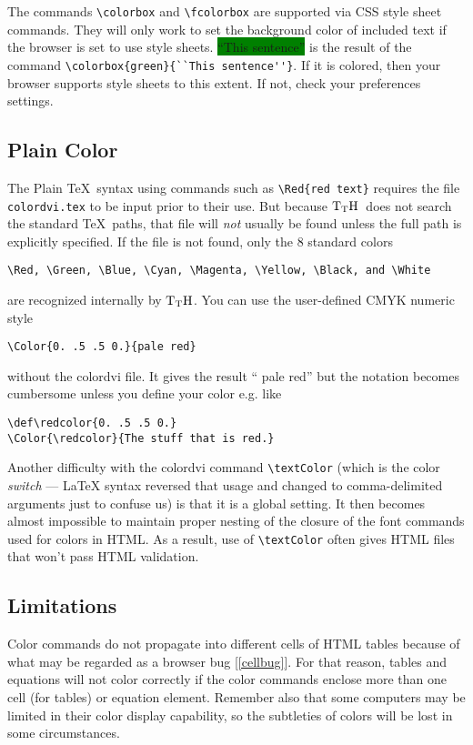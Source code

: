 \documentclass[12pt]{article}
\newif\iftth
\def\TtH{$\rm{}T_TH$}
\begin{document}
The commands \verb!\colorbox! and \verb!\fcolorbox! are supported via
CSS style sheet commands. They will only work to set the background
color of included text if the browser is set to use style sheets. 
\colorbox{green}{``This sentence''} is the result of the command
\verb!\colorbox{green}{``This sentence''}!. If it is colored, then
your browser supports style sheets to this extent. If not, check your
preferences settings.

\subsection{Plain Color}

The Plain \TeX\ syntax using commands such as \verb!\Red{red text}! requires
the file \verb!colordvi.tex! to be input prior to their use. But
because \TtH\ does not search the standard \TeX\ paths, that file will
\emph{not} usually be found unless the full path is explicitly
specified. If the file is not found, only the 8 standard colors
\begin{verbatim}
\Red, \Green, \Blue, \Cyan, \Magenta, \Yellow, \Black, and \White
\end{verbatim}
 are
recognized internally by \TtH. You can use the user-defined CMYK numeric
style 
\begin{verbatim}
\Color{0. .5 .5 0.}{pale red}
\end{verbatim}
without the colordvi
file. It gives the result ``\iftth\Color{0. .5 .5 0.}{pale red}\else
\textcolor[cmyk]{0.,.5,.5,0.}{pale red}\fi'' but the
notation becomes cumbersome unless you define your color
e.g. like
\begin{verbatim}
\def\redcolor{0. .5 .5 0.}
\Color{\redcolor}{The stuff that is red.}
\end{verbatim}

Another difficulty with the colordvi
command \verb!\textColor! (which is the color \emph{switch} --- \LaTeX
syntax reversed that usage and changed to comma-delimited arguments
just to confuse us) is that it is a global setting. It then
becomes almost impossible to maintain proper nesting of the closure of
the font commands used for colors in HTML. As a result, use of
\verb!\textColor! often gives HTML files that won't pass HTML validation.

\subsection{Limitations}
Color commands do not propagate into different cells of HTML tables
because of what may be regarded as a browser bug
[\ref{cellbug}]. For that reason, tables and equations will not color
correctly if the color commands enclose more than one cell (for
tables) or equation element. Remember also that some computers may be
limited in their color display capability, so the subtleties of colors
will be lost in some circumstances. 
\end{document}
